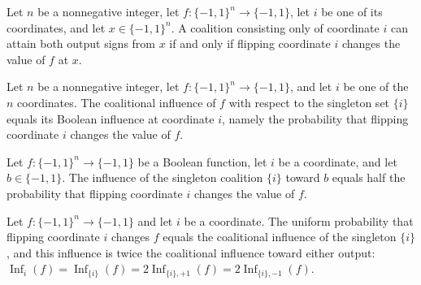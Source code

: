 \begin{theorem}
\label{FABL.coalitionCanAttain_singleton_both_iff_isPivotal}
\leanok
{}
Let $n$ be a nonnegative integer, let $f:\{-1,1\}^n\to\{-1,1\}$, let $i$ be one of its
coordinates, and let $x\in\{-1,1\}^n$. A coalition consisting only of coordinate $i$ can
attain both output signs from $x$ if and only if flipping coordinate $i$ changes the
value of $f$ at $x$.
\end{theorem}

\begin{theorem}
\label{FABL.coalitionalInfluence_singleton}
\leanok
{}
Let $n$ be a nonnegative integer, let $f:\{-1,1\}^n\to\{-1,1\}$, and let $i$ be one of
the $n$ coordinates. The coalitional influence of $f$ with respect to the singleton set
$\{i\}$ equals its Boolean influence at coordinate $i$, namely the probability that
flipping coordinate $i$ changes the value of $f$.
\end{theorem}

\begin{theorem}
\label{FABL.coalitionalInfluenceToward_singleton}
\leanok
{}
Let $f:\{−1,1\}^n\to\{−1,1\}$ be a Boolean function, let $i$ be a coordinate, and let
$b\in\{−1,1\}$. The influence of the singleton coalition $\{i\}$ toward $b$ equals half
the probability that flipping coordinate $i$ changes the value of $f$.
\end{theorem}

\begin{theorem}
\label{FABL.exercise9_25_singleton_equalities}
\leanok
{}
Let $f:\{-1,1\}^n\to\{-1,1\}$ and let $i$ be a coordinate. The uniform probability that
flipping coordinate $i$ changes $f$ equals the coalitional influence of the singleton
$\{i\}$, and this influence is twice the coalitional influence toward either output:
$\operatorname{Inf}_i(f)=\operatorname{Inf}_{\{i\}}(f)=2\operatorname{Inf}_{\{i\},+1}(f)=2\operatorname{Inf}_{\{i\},-1}(f)$.
\end{theorem}


